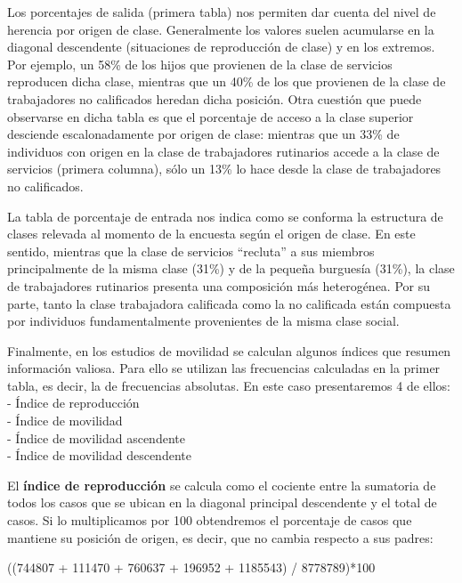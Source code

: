\documentclass[
]{book}
\newenvironment{Shaded}{\begin{snugshade}}{\end{snugshade}}
\newcommand{\DecValTok}[1]{\textcolor[rgb]{0.00,0.00,0.81}{#1}}
\newcommand{\NormalTok}[1]{#1}
\newcommand{\SpecialCharTok}[1]{\textcolor[rgb]{0.00,0.00,0.00}{#1}}
\begin{document}
Los porcentajes de salida (primera tabla) nos permiten dar cuenta del nivel de herencia por origen de clase. Generalmente los valores suelen acumularse en la diagonal descendente (situaciones de reproducción de clase) y en los extremos. Por ejemplo, un 58\% de los hijos que provienen de la clase de servicios reproducen dicha clase, mientras que un 40\% de los que provienen de la clase de trabajadores no calificados heredan dicha posición. Otra cuestión que puede observarse en dicha tabla es que el porcentaje de acceso a la clase superior desciende escalonadamente por origen de clase: mientras que un 33\% de individuos con origen en la clase de trabajadores rutinarios accede a la clase de servicios (primera columna), sólo un 13\% lo hace desde la clase de trabajadores no calificados.

La tabla de porcentaje de entrada nos indica como se conforma la estructura de clases relevada al momento de la encuesta según el origen de clase. En este sentido, mientras que la clase de servicios ``recluta'' a sus miembros principalmente de la misma clase (31\%) y de la pequeña burguesía (31\%), la clase de trabajadores rutinarios presenta una composición más heterogénea. Por su parte, tanto la clase trabajadora calificada como la no calificada están compuesta por individuos fundamentalmente provenientes de la misma clase social.

Finalmente, en los estudios de movilidad se calculan algunos índices que resumen información valiosa. Para ello se utilizan las frecuencias calculadas en la primer tabla, es decir, la de frecuencias absolutas. En este caso presentaremos 4 de ellos:\\
- Índice de reproducción\\
- Índice de movilidad\\
- Índice de movilidad ascendente\\
- Índice de movilidad descendente

El \textbf{índice de reproducción} se calcula como el cociente entre la sumatoria de todos los casos que se ubican en la diagonal principal descendente y el total de casos. Si lo multiplicamos por 100 obtendremos el porcentaje de casos que mantiene su posición de origen, es decir, que no cambia respecto a sus padres:

\begin{Shaded}
\begin{Highlighting}[]
\NormalTok{((}\DecValTok{744807} \SpecialCharTok{+} \DecValTok{111470} \SpecialCharTok{+} \DecValTok{760637} \SpecialCharTok{+} \DecValTok{196952} \SpecialCharTok{+} \DecValTok{1185543}\NormalTok{) }\SpecialCharTok{/} \DecValTok{8778789}\NormalTok{)}\SpecialCharTok{*}\DecValTok{100}
\end{Highlighting}
\end{Shaded}
\end{document}
